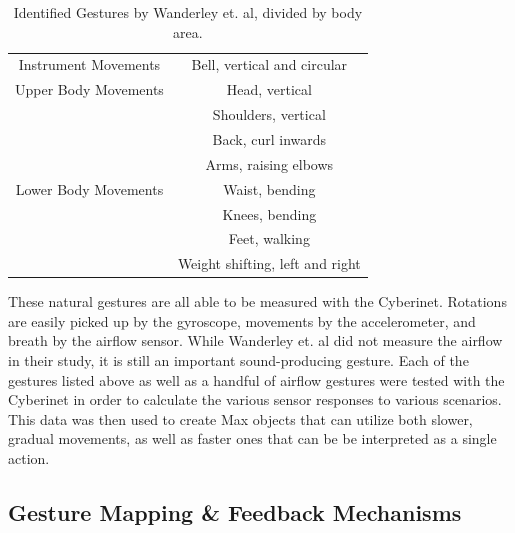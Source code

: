\begin{table}[]
    \centering
    \begin{tabular}{|c||c|}
    \hline
       Instrument Movements  & Bell, vertical and circular \\
        Upper Body Movements & Head, vertical \\
        & Shoulders, vertical \\
        & Back, curl inwards \\
        & Arms, raising elbows \\
        Lower Body Movements & Waist, bending \\
        & Knees, bending \\
        & Feet, walking \\
        & Weight shifting, left and right\\
        \hline
    \end{tabular}
    \caption{Identified Gestures by Wanderley et. al\cite{wanderleyClarinetGesture2005}, divided by body area.}
    \label{tab:generalGestures}
\end{table}

These natural gestures are all able to be measured with the Cyberinet. Rotations are easily picked up by the gyroscope, movements by the accelerometer, and breath by the airflow sensor. While Wanderley et. al did not measure the airflow in their study, it is still an important sound-producing gesture\cite{miranda_Wanderley_instrumentControl_2006}. Each of the gestures listed above as well as a handful of airflow gestures were tested with the Cyberinet in order to calculate the various sensor responses to various scenarios. This data was then used to create Max objects that can utilize both slower, gradual movements, as well as faster ones that can be be interpreted as a single action.



\subsection{Gesture Mapping \& Feedback Mechanisms}

